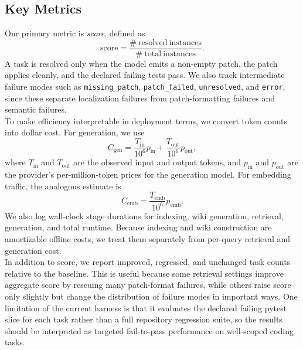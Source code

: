 \documentclass[a4paper,12pt]{article}
\begin{document}
\subsection{Key Metrics}

Our primary metric is \emph{score}, defined as\\
\[
\mathrm{score} = \frac{\#\ \mathrm{resolved\ instances}}{\#\ \mathrm{total\ instances}}.
\]
A task is resolved only when the model emits a non-empty patch, the patch applies cleanly, and the declared failing tests pass. We also track intermediate failure modes such as \texttt{missing\_patch}, \texttt{patch\_failed}, \texttt{unresolved}, and \texttt{error}, since these separate localization failures from patch-formatting failures and semantic failures.\\

To make efficiency interpretable in deployment terms, we convert token counts into dollar cost. For generation, we use\\
\[
C_{\mathrm{gen}} = \frac{T_{\mathrm{in}}}{10^6} p_{\mathrm{in}} + \frac{T_{\mathrm{out}}}{10^6} p_{\mathrm{out}},
\]
where \(T_{\mathrm{in}}\) and \(T_{\mathrm{out}}\) are the observed input and output tokens, and \(p_{\mathrm{in}}\) and \(p_{\mathrm{out}}\) are the provider's per-million-token prices for the generation model. For embedding traffic, the analogous estimate is\\
\[
C_{\mathrm{emb}} = \frac{T_{\mathrm{emb}}}{10^6} p_{\mathrm{emb}}.
\]
We also log wall-clock stage durations for indexing, wiki generation, retrieval, generation, and total runtime. Because indexing and wiki construction are amortizable offline costs, we treat them separately from per-query retrieval and generation cost.\\

In addition to score, we report improved, regressed, and unchanged task counts relative to the baseline. This is useful because some retrieval settings improve aggregate score by rescuing many patch-format failures, while others raise score only slightly but change the distribution of failure modes in important ways. One limitation of the current harness is that it evaluates the declared failing pytest slice for each task rather than a full repository regression suite, so the results should be interpreted as targeted fail-to-pass performance on well-scoped coding tasks.\\
\end{document}
